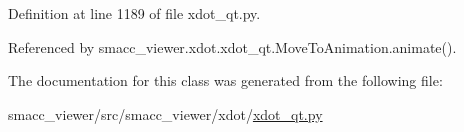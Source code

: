 Definition at line 1189 of file xdot\+\_\+qt.\+py.



Referenced by smacc\+\_\+viewer.\+xdot.\+xdot\+\_\+qt.\+Move\+To\+Animation.\+animate().



The documentation for this class was generated from the following file\+:\begin{DoxyCompactItemize}
\item 
smacc\+\_\+viewer/src/smacc\+\_\+viewer/xdot/\hyperlink{xdot__qt_8py}{xdot\+\_\+qt.\+py}\end{DoxyCompactItemize}
